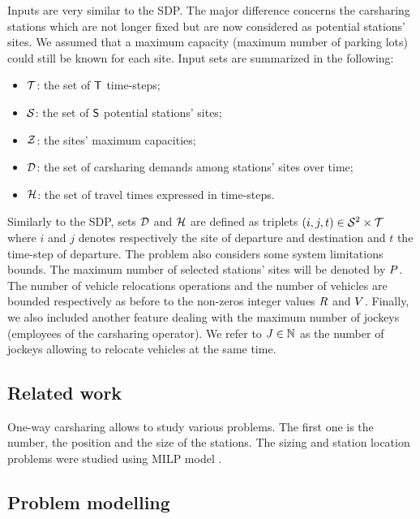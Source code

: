 \begin{bibunit}[ieeetr]
\bigbreak
Inputs are very similar to the SDP.
The major difference concerns the carsharing stations which are not longer fixed but are now considered as potential stations' sites.
We assumed that a maximum capacity (\ie maximum number of parking lots) could still be known for each site.
Input sets are summarized in the following:
\begin{itemize}
\item $\mathcal{T}$: the set of $\mathsf{T}$ time-steps;
\item $\mathcal{S}$: the set of $\mathsf{S}$ potential stations' sites;
\item $\mathcal{Z}$: the sites' maximum capacities;
\item $\mathcal{D}$: the set of carsharing demands among stations' sites over time;
\item $\mathcal{H}$: the set of travel times expressed in time-steps.
\end{itemize}
Similarly to the SDP, sets $\mathcal{D}$ and $\mathcal{H}$ are defined as triplets $(i,j,t) \in \mathcal{S}^2 \times \mathcal{T}$ where $i$ and $j$ denotes respectively the site of departure and destination and $t$ the time-step of departure.
The problem also considers some system limitations bounds.
The maximum number of selected stations' sites will be denoted by $P$.
The number of vehicle relocations operations and the number of vehicles are bounded respectively as before to the non-zeros integer values $R$ and $V$.
Finally, we also included another feature dealing with the maximum number of jockeys (employees of the carsharing operator).
We refer to $J \in \mathbb{N}$ as the number of jockeys allowing to relocate vehicles at the same time.


\subsection{Related work}



One-way carsharing allows to study various problems.
The first one is the number, the position and the size of the stations.
The sizing and station location problems were studied using MILP model \cite{rickenberg_decision_2013}.


\subsection{Problem modelling}


\end{bibunit}
